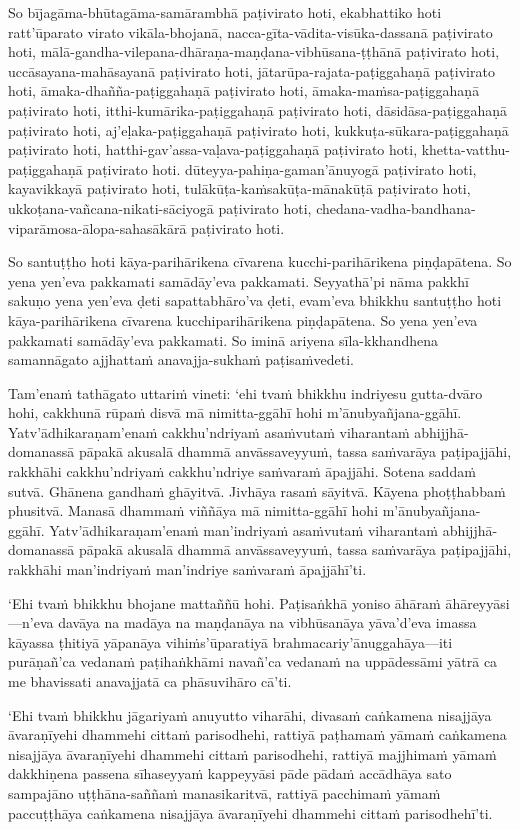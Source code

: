 So bījagāma-bhūtagāma-samārambhā paṭivirato hoti, ekabhattiko hoti ratt'ūparato virato vikāla-bhojanā, nacca-gīta-vādita-visūka-dassanā paṭivirato hoti, mālā­-gandha-vilepana­-dhāraṇa­-maṇḍana­-vibhūsana-ṭṭhānā paṭivirato hoti, uccāsayana-mahāsayanā paṭivirato hoti, jātarūpa-rajata-paṭiggahaṇā paṭivirato hoti, āmaka-dhañña-paṭiggahaṇā paṭivirato hoti, āmaka-maṁsa-paṭiggahaṇā paṭivirato hoti, itthi-kumārika-paṭiggahaṇā paṭivirato hoti, dāsidāsa-paṭiggahaṇā paṭivirato hoti, aj'eḷaka-paṭiggahaṇā paṭivirato hoti, kukkuṭa-sūkara-paṭiggahaṇā paṭivirato hoti, hatthi-gav'assa-vaḷava-paṭiggahaṇā paṭivirato hoti, khetta-vatthu-paṭiggahaṇā paṭivirato hoti. dūteyya-pahiṇa-gaman'ānuyogā paṭivirato hoti, kayavikkayā paṭivirato hoti, tulākūṭa-kaṁsakūṭa-mānakūṭā paṭivirato hoti, ukkoṭana-vañcana-nikati-sāciyogā paṭivirato hoti, chedana-­vadha-bandhana­-viparāmosa-ālopa-sahasākārā paṭivirato hoti.

So santuṭṭho hoti kāya-parihārikena cīvarena kucchi-parihārikena piṇḍapātena. So yena yen'eva pakkamati samādāy'eva pakkamati. Seyyathā'pi nāma pakkhī sakuṇo yena yen'eva ḍeti sapattabhāro'va ḍeti, evam'eva bhikkhu santuṭṭho hoti kāya-parihārikena cīvarena kucchiparihārikena piṇḍapātena. So yena yen'eva pakkamati samādāy'eva pakkamati. So iminā ariyena sīla-kkhandhena samannāgato ajjhattaṁ anavajja-sukhaṁ paṭisaṁvedeti.

\suttaRef{[MN 51]}

Tam'enaṁ tathāgato uttariṁ vineti: `ehi tvaṁ bhikkhu indriyesu gutta-dvāro hohi, cakkhunā rūpaṁ disvā mā nimitta-ggāhī hohi m'ānubyañjana-ggāhī. Yatv'ādhikaraṇam'enaṁ cakkhu'ndriyaṁ asaṁvutaṁ viharantaṁ abhijjhā-domanassā pāpakā akusalā dhammā anvāssaveyyuṁ, tassa saṁvarāya paṭipajjāhi, rakkhāhi cakkhu'ndriyaṁ cakkhu'ndriye saṁvaraṁ āpajjāhi. Sotena saddaṁ sutvā. Ghānena gandhaṁ ghāyitvā. Jivhāya rasaṁ sāyitvā. Kāyena phoṭṭhabbaṁ phusitvā. Manasā dhammaṁ viññāya mā nimitta-ggāhī hohi m'ānubyañjana-ggāhī. Yatv'ādhikaraṇam'enaṁ man'indriyaṁ asaṁvutaṁ viharantaṁ abhijjhā-domanassā pāpakā akusalā dhammā anvāssaveyyuṁ, tassa saṁvarāya paṭipajjāhi, rakkhāhi man'indriyaṁ man'indriye saṁvaraṁ āpajjāhī'ti.

`Ehi tvaṁ bhikkhu bhojane mattaññū hohi. Paṭisaṅkhā yoniso āhāraṁ āhāreyyāsi—n'eva davāya na madāya na maṇḍanāya na vibhūsanāya yāva'd'eva imassa kāyassa ṭhitiyā yāpanāya vihiṁs'ūparatiyā brahmacariy'ānuggahāya—iti purāṇañ'ca vedanaṁ paṭihaṅkhāmi navañ'ca vedanaṁ na uppādessāmi yātrā ca me bhavissati anavajjatā ca phāsuvihāro cā'ti.

`Ehi tvaṁ bhikkhu jāgariyaṁ anuyutto viharāhi, divasaṁ caṅkamena nisajjāya āvaraṇīyehi dhammehi cittaṁ parisodhehi, rattiyā paṭhamaṁ yāmaṁ caṅkamena nisajjāya āvaraṇīyehi dhammehi cittaṁ parisodhehi, rattiyā majjhimaṁ yāmaṁ dakkhiṇena passena sīhaseyyaṁ kappeyyāsi pāde pādaṁ accādhāya sato sampajāno uṭṭhāna-saññaṁ manasikaritvā, rattiyā pacchimaṁ yāmaṁ paccuṭṭhāya caṅkamena nisajjāya āvaraṇīyehi dhammehi cittaṁ parisodhehī'ti.

